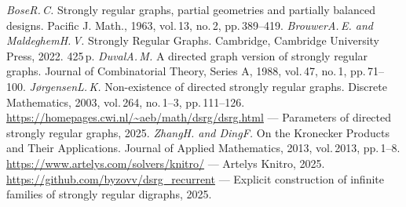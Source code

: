 \documentclass{article}
\begin{document}
\begin{thebibliography}{99}
        \textit{Bose\;R.\,C.}
        {Strongly regular graphs, partial geometries and partially balanced designs}. Pacific J. Math., 1963, vol.\,13, no.\,2, pp.\,389--419.
        \textit{Brouwer\;A.\,E. and Maldeghem\;H.\,V.}
        Strongly Regular Graphs.
        Cambridge, Cambridge University Press, 2022. 425\,p.
        \textit{Duval\;A.\,M.}
        {A directed graph version of strongly regular graphs}. Journal of Combinatorial Theory, Series A, 1988, vol.\,47, no.\,1, pp.\,71--100.
        \textit{J{\o}rgensen\;L.\,K.}
        {Non-existence of directed strongly regular graphs}. Discrete Mathematics, 2003, vol.\,264, no.\,1--3, pp.\,111--126.         
        \url{https://homepages.cwi.nl/~aeb/math/dsrg/dsrg.html} ---
        Parameters of directed strongly regular graphs, 2025.
        \textit{Zhang\;H. and Ding\;F.}
        {On the Kronecker Products and Their Applications}. Journal of Applied Mathematics, 2013, vol.\,2013, pp.\,1--8.         
        \url{https://www.artelys.com/solvers/knitro/} ---
        Artelys Knitro, 2025.
        \url{https://github.com/byzovv/dsrg\_recurrent} ---
        Explicit construction of infinite families of strongly regular digraphs, 2025.       
\end{thebibliography}
\end{document}
